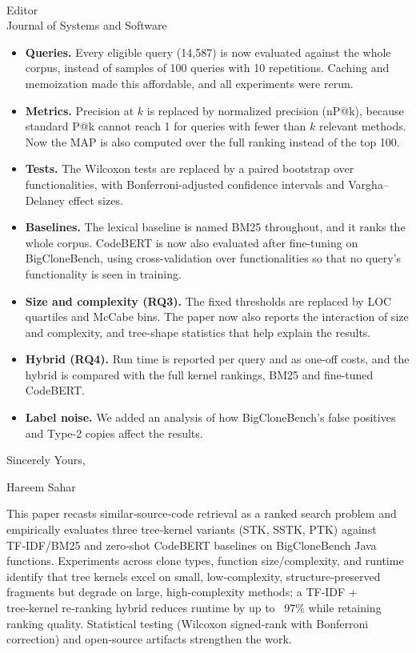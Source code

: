 \documentclass[
pagenumber=false, %
parskip=half, %
fromalign=right, %
foldmarks=false, %
addrfield=false %
]{scrlttr2}
\begin{document}
\begin{letter}{\\Editor\\Journal of Systems and Software}
\begin{itemize}
		\item \textbf{Queries.} Every eligible query (14,587) is now evaluated against the whole corpus,
		instead of samples of 100 queries with 10 repetitions. Caching and memoization made this
		affordable, and all experiments were rerun.
		
		
		\item \textbf{Metrics.} Precision at $k$ is replaced by normalized precision (nP@k),
		because standard P@k cannot reach 1 for queries with fewer than $k$ relevant methods. Now the MAP is also computed over the full ranking instead of the top 100.
		\item \textbf{Tests.} The Wilcoxon tests are replaced by a paired bootstrap over functionalities, with
		Bonferroni-adjusted confidence intervals and Vargha--Delaney effect sizes.
		\item \textbf{Baselines.} The lexical baseline is named BM25 throughout, and it ranks the whole
		corpus. CodeBERT is now also evaluated after fine-tuning on BigCloneBench, using
		cross-validation over functionalities so that no query's functionality is seen in training.
		\item \textbf{Size and complexity (RQ3).} The fixed thresholds are replaced by LOC quartiles and
		McCabe bins. The paper now also reports the interaction of size and complexity, and tree-shape
		statistics that help explain the results.
		\item \textbf{Hybrid (RQ4).} Run time is reported per query and as one-off costs, and the hybrid
		is compared with the full kernel rankings, BM25 and fine-tuned CodeBERT.
		\item \textbf{Label noise.} We added an analysis of how BigCloneBench's false positives and Type-2
		copies affect the results.
		
	\end{itemize}

	
	Sincerely Yours,

	Hareem Sahar \\

	\clearpage
		
	This paper recasts similar‑source‑code retrieval as a ranked search problem and empirically evaluates three tree‑kernel variants (STK, SSTK, PTK) against TF‑IDF/BM25 and zero‑shot CodeBERT baselines on BigCloneBench Java functions. Experiments across clone types, function size/complexity, and runtime identify that tree kernels excel on small, low‑complexity, structure‑preserved fragments but degrade on large, high‑complexity methods; a TF‑IDF + tree‑kernel re‑ranking hybrid reduces runtime by up to ~97\% while retaining ranking quality. Statistical testing (Wilcoxon signed‑rank with Bonferroni correction) and open‑source artifacts strengthen the work. 
	

\end{letter}
\end{document}
